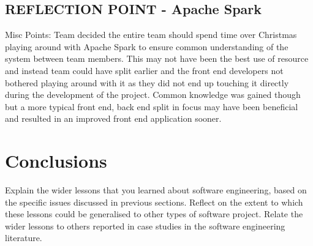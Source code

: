 \documentclass{l3proj}
\begin{document}

\subsection{REFLECTION POINT - Apache Spark}
\label{sparkreflection}
Misc Points:
Team decided the entire team should spend time over Christmas playing around with Apache Spark to ensure common understanding of the system between team members. This may not have been the best use of resource and instead team could have split earlier and the front end developers not bothered playing around with it as they did not end up touching it directly during the development of the project. Common knowledge was gained though but a more typical front end, back end split in focus may have been beneficial and resulted in an improved front end application sooner.


\section{Conclusions}
\label{sec:conclusions}

Explain the wider lessons that you learned about software engineering,
based on the specific issues discussed in previous sections.  Reflect
on the extent to which these lessons could be generalised to other
types of software project.  Relate the wider lessons to others
reported in case studies in the software engineering literature.



\end{document}
